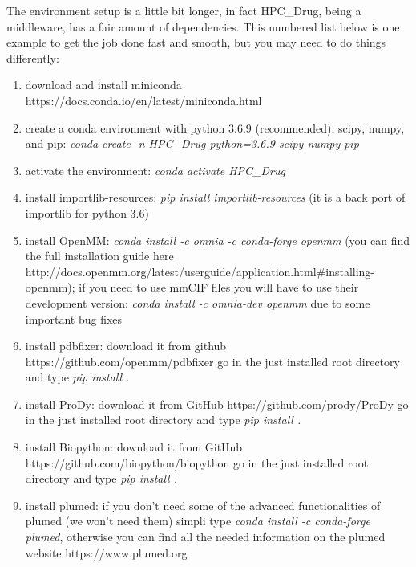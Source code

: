 	The environment setup is a little bit longer, in fact HPC\_Drug, being a middleware, has a fair amount of dependencies. This numbered list below is one example to get the job done fast and smooth, but you may need to do things differently:
	\begin{enumerate}
		\item download and install miniconda https://docs.conda.io/en/latest/miniconda.html
		
		\item create a conda environment with python 3.6.9 (recommended), scipy\cite{scipy}, numpy\cite{numpy}, and pip: \emph{conda create -n HPC\_Drug python=3.6.9 scipy numpy pip}
		
		\item activate the environment: \emph{conda activate HPC\_Drug}
		
		\item install importlib-resources: \emph{pip install importlib-resources} (it is a back port of importlib for python 3.6)
		
		\item install OpenMM\cite{openmm}: \emph{conda install -c omnia -c conda-forge openmm} (you can find the full installation guide here\\ http://docs.openmm.org/latest/userguide/application.html\#installing-openmm); if you need to use mmCIF files you will have to use their development version: \emph{conda install -c omnia-dev openmm} due to some important bug fixes
		
		\item install pdbfixer\cite{pdbfixer}: download it from github https://github.com/openmm/pdbfixer go in the just installed root directory and type \emph{pip install .}
		
		\item install ProDy\cite{prody}: download it from GitHub https://github.com/prody/ProDy go in the just installed root directory and type \emph{pip install .}
		
		\item install Biopython\cite{biopython}: download it from GitHub https://github.com/biopython/biopython go in the just installed root directory and type \emph{pip install .}
		
		\item install plumed\cite{plumed}: if you don't need some of the advanced functionalities of plumed (we won't need them) simpli type \emph{conda install -c conda-forge plumed}, otherwise you can find all the needed information on the plumed website https://www.plumed.org
		

\end{enumerate}
